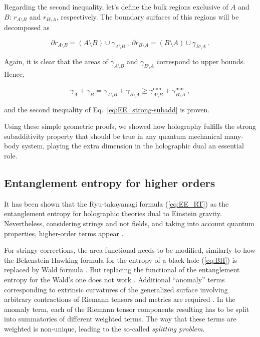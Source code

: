 \documentclass[twocolumn]{revtex4}
\providecommand{\eq}[2]{
    \begin{equation}
        #2
    \label{eq:#1}
    \end{equation}
}
\begin{document}
Regarding the second inequality, let's define the bulk regions exclusive of $A$ and $B$: $r_{A \setminus B}$ and $r_{B \setminus A}$, respectively. The boundary surfaces of this regions will be decomposed as
\eq{SS_dr-2}{
    \partial r_{A \setminus B} = (A \setminus B) \cup \gamma_{A \setminus B} \ , \ \partial r_{B \setminus A } = (B \setminus A) \cup \gamma_{B \setminus A} \ . \nonumber
}
Again, it is clear that the areas of $\gamma_{A \setminus B}$ and $\gamma_{B \setminus A}$ correspond to upper bounds. Hence,
\eq{SS_gamma-2}{
    \gamma_A + \gamma_B = \gamma_{A \setminus B} + \gamma_{B \setminus A} \ge \gamma^{\text{min}}_{A \setminus B} + \gamma^{\text{min}}_{B \setminus A} \ , \nonumber
}
and the second inequality of Eq.~\ref{eq:EE_strong-subadd} is proven.

Using these simple geometric proofs, we showed how holography fulfills the strong subadditivity property that should be true in any quantum mechanical many-body system, playing the extra dimension in the holographic dual an essential role.



\subsection{Entanglement entropy for higher orders} \label{s:EE_HO}

It has been shown that the Ryu-takayanagi formula (\ref{eq:EE_RT}) as the entanglement entropy for holographic theories dual to Einstein gravity. Nevertheless, considering strings and not fields, and taking into account quantum properties, higher-order terms appear \cite{bueno_holographic_2021}.

For stringy corrections, the area functional needs to be modified, similarly to how the Bekenstein-Hawking formula for the entropy of a black hole (\ref{eq:BH}) is replaced by Wald formula \cite{iyer_properties_1994}. But replacing the functional of the entanglement entropy for the Wald's one does not work \cite{bueno_holographic_2021}. Additional ``anomaly'' terms corresponding to extrinsic curvatures of the generalized surface involving arbitrary contractions of Riemann tensors and metrics are required \cite{dong_holographic_2014}. In the anomaly term, each of the Riemann tensor components resulting has to be split into summatories of different weighted terms. The way that these terms are weighted is non-unique, leading to the so-called \textit{splitting problem}.
\end{document}
